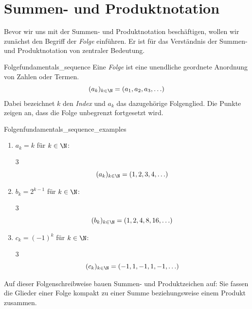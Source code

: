 \section{Summen- und Produktnotation}
\label{sec:fundamentals_summation_and_product_notation}

Bevor wir uns mit der Summen- und Produktnotation beschäftigen, wollen wir
zunächst den Begriff der \emph{Folge} einführen. Er ist für das Verständnis
der Summen- und Produktnotation von zentraler Bedeutung.

\begin{DefinitionBox}{Folge}{fundamentals_sequence}
  Eine \emph{Folge}  ist eine unendliche geordnete
  Anordnung von Zahlen oder Termen.
  \[
    (a_k)_{k\in\N}=(a_1,a_2,a_3,\ldots)
  \]
  Dabei bezeichnet $k$ den \emph{Index} und $a_k$ das dazugehörige
  Folgenglied. Die Punkte zeigen an, dass die Folge unbegrenzt fortgesetzt wird.
\end{DefinitionBox}

\begin{ExampleBox}{Folgen}{fundamentals_sequence_examples}
  \begin{enumerate}[label=\alph*),leftmargin=2em,itemsep=0.7em]
    \item $a_k=k$ für $k\in\N$:
      \begin{ClozeArea}[30]{3}
        \[
          (a_k)_{k\in\N}=(1,2,3,4,\ldots)
        \]
      \end{ClozeArea}
    \item $b_k=2^{k-1}$ für $k\in\N$:
      \begin{ClozeArea}[30]{3}
        \[
          (b_k)_{k\in\N}=(1,2,4,8,16,\ldots)
        \]
      \end{ClozeArea}
    \item $c_k=(-1)^k$ für $k\in\N$:
      \begin{ClozeArea}[30]{3}
        \[
          (c_k)_{k\in\N}=(-1,1,-1,1,-1,\ldots)
        \]
      \end{ClozeArea}
  \end{enumerate}
\end{ExampleBox}

Auf dieser Folgenschreibweise bauen Summen- und Produktzeichen auf: Sie fassen
die Glieder einer Folge kompakt zu einer Summe beziehungsweise einem Produkt
zusammen.




